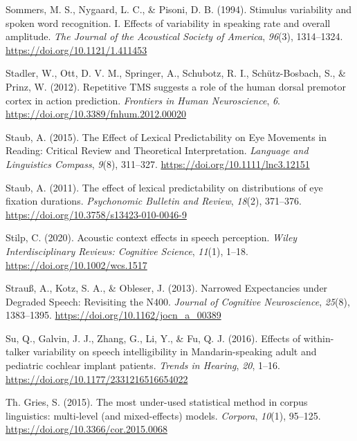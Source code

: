 \documentclass[a4paper, nobind]{templates/ociamthesis}
\newlength{\cslhangindent}
\newenvironment{CSLReferences}[2] %
 {%
  \setlength{\parindent}{0pt}
  \ifodd #1
  \let\oldpar\par
  \def\par{\hangindent=\cslhangindent\oldpar}
  \fi
  \setlength{\parskip}{1mm}
  \setlength{\baselineskip}{6mm}
 }%
 {}
\begin{document}
\begin{CSLReferences}{1}{0}
\leavevmode{}%
Sommers, M. S., Nygaard, L. C., \& Pisoni, D. B. (1994). Stimulus variability and spoken word recognition. I. Effects of variability in speaking rate and overall amplitude. \emph{The Journal of the Acoustical Society of America}, \emph{96}(3), 1314--1324. \url{https://doi.org/10.1121/1.411453}

\leavevmode{}%
Stadler, W., Ott, D. V. M., Springer, A., Schubotz, R. I., Schütz-Bosbach, S., \& Prinz, W. (2012). Repetitive TMS suggests a role of the human dorsal premotor cortex in action prediction. \emph{Frontiers in Human Neuroscience}, \emph{6}. \url{https://doi.org/10.3389/fnhum.2012.00020}

\leavevmode{}%
Staub, A. (2015). The Effect of Lexical Predictability on Eye Movements in Reading: Critical Review and Theoretical Interpretation. \emph{Language and Linguistics Compass}, \emph{9}(8), 311--327. \url{https://doi.org/10.1111/lnc3.12151}

\leavevmode{}%
Staub, A. (2011). {The effect of lexical predictability on distributions of eye fixation durations}. \emph{Psychonomic Bulletin and Review}, \emph{18}(2), 371--376. \url{https://doi.org/10.3758/s13423-010-0046-9}

\leavevmode{}%
Stilp, C. (2020). {Acoustic context effects in speech perception}. \emph{Wiley Interdisciplinary Reviews: Cognitive Science}, \emph{11}(1), 1--18. \url{https://doi.org/10.1002/wcs.1517}

\leavevmode{}%
Strauß, A., Kotz, S. A., \& Obleser, J. (2013). Narrowed Expectancies under Degraded Speech: Revisiting the N400. \emph{Journal of Cognitive Neuroscience}, \emph{25}(8), 1383--1395. \url{https://doi.org/10.1162/jocn_a_00389}

\leavevmode{}%
Su, Q., Galvin, J. J., Zhang, G., Li, Y., \& Fu, Q. J. (2016). {Effects of within-talker variability on speech intelligibility in Mandarin-speaking adult and pediatric cochlear implant patients}. \emph{Trends in Hearing}, \emph{20}, 1--16. \url{https://doi.org/10.1177/2331216516654022}

\leavevmode{}%
Th. Gries, S. (2015). {The most under-used statistical method in corpus linguistics: multi-level (and mixed-effects) models}. \emph{Corpora}, \emph{10}(1), 95--125. \url{https://doi.org/10.3366/cor.2015.0068}


\end{CSLReferences}
\end{document}
